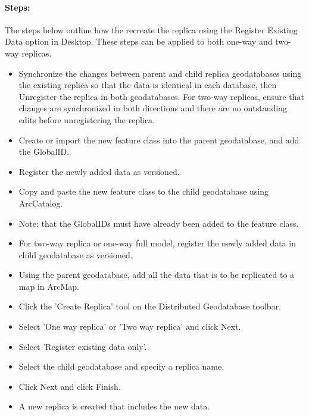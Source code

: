 \begin{adjmulticols}{2}{\innerMar}{\outerMar}
\paragraph[Steps]{Steps:\texorpdfstring{\\}{}}
The steps below outline how the recreate the replica using the Register Existing Data option in Desktop. These steps can be applied to both one-way and two-way replicas.
\begin{itemize}
\item Synchronize the changes between parent and child replica geodatabases using the existing replica so that the data is identical in each database, then Unregister the replica in both geodatabases. For two-way replicas, ensure that changes are synchronized in both directions and there are no outstanding edits before unregistering the replica.
\item Create or import the new feature class into the parent geodatabase, and add the GlobalID.
\item Register the newly added data as versioned.
\item Copy and paste the new feature class to the child geodatabase using ArcCatalog.
\item Note: that the GlobalIDs must have already been added to the feature class.
\item For two-way replica or one-way full model, register the newly added data in child geodatabase as versioned.
\item Using the parent geodatabase, add all the data that is to be replicated to a map in ArcMap.
\item Click the 'Create Replica' tool on the Distributed Geodatabase toolbar.
\item Select 'One way replica' or 'Two way replica' and click Next.
\item Select 'Register existing data only'.
\item Select the child geodatabase and specify a replica name.
\item Click Next and click Finish.
\item A new replica is created that includes the new data.
\end{itemize}
\end{adjmulticols}


